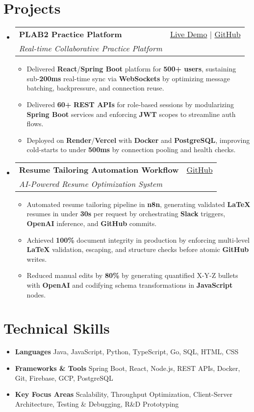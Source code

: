 \documentclass[letterpaper,11pt]{article}
\makeatletter
\newcommand{\resumeItem}[1]{\item\small{#1 \vspace{-2pt}}}
\newcommand{\resumeSubheading}[4]{
  \vspace{-1pt}\item
    \begin{tabular*}{0.97\textwidth}[t]{l@{\extracolsep{\fill}}r}
      \textbf{#1} & #2 \\
      \textit{\small#3} & \textit{\small #4} \\
    \end{tabular*}\vspace{-5pt}
}
\newcommand{\resumeSubHeadingListStart}{\begin{itemize}[leftmargin=*]}
\newcommand{\resumeSubHeadingListEnd}{\end{itemize}}
\newcommand{\resumeItemListStart}{\begin{itemize}}
\newcommand{\resumeItemListEnd}{\end{itemize}\vspace{-5pt}}
\makeatother
\begin{document}
\section{Projects}
  \resumeSubHeadingListStart
    \resumeSubheading
      {\textbf{PLAB2 Practice Platform}}{\href{https://plab2practice.com}{Live Demo} | \href{https://github.com/altansaid/plab2projectnew}{GitHub}}
      {Real-time Collaborative Practice Platform}{}
      \resumeItemListStart
        \resumeItem{Delivered \textbf{React}/\textbf{Spring Boot} platform for \textbf{500+ users}, sustaining sub-\textbf{200ms} real-time sync via \textbf{WebSockets} by optimizing message batching, backpressure, and connection reuse.}
        \resumeItem{Delivered \textbf{60+} \textbf{REST APIs} for role-based sessions by modularizing \textbf{Spring Boot} services and enforcing \textbf{JWT} scopes to streamline auth flows.}
        \resumeItem{Deployed on \textbf{Render}/\textbf{Vercel} with \textbf{Docker} and \textbf{PostgreSQL}, improving cold-starts to under \textbf{500ms} by connection pooling and health checks.}
      \resumeItemListEnd

    \resumeSubheading
      {\textbf{Resume Tailoring Automation Workflow}}{\href{https://github.com/altansaid/resume-automation-workflow}{GitHub}}
      {AI-Powered Resume Optimization System}{}
      \resumeItemListStart
    \resumeItem{Automated resume tailoring pipeline in \textbf{n8n}, generating validated \textbf{LaTeX} resumes in under \textbf{30s} per request by orchestrating \textbf{Slack} triggers, \textbf{OpenAI} inference, and \textbf{GitHub} commits.}
    \resumeItem{Achieved \textbf{100\%} document integrity in production by enforcing multi-level \textbf{LaTeX} validation, escaping, and structure checks before atomic \textbf{GitHub} writes.}
    \resumeItem{Reduced manual edits by \textbf{80\%} by generating quantified X-Y-Z bullets with \textbf{OpenAI} and codifying schema transformations in \textbf{JavaScript} nodes.}



      \resumeItemListEnd
  \resumeSubHeadingListEnd

\section{Technical Skills}
  \resumeItemListStart
    \resumeItem{\textbf{Languages}}{Java, JavaScript, Python, TypeScript, Go, SQL, HTML, CSS}
    \resumeItem{\textbf{Frameworks \& Tools}}{Spring Boot, React, Node.js, REST APIs, Docker, Git, Firebase, GCP, PostgreSQL}
    \resumeItem{\textbf{Key Focus Areas}}{Scalability, Throughput Optimization, Client-Server Architecture, Testing \& Debugging, R\&D Prototyping}
  \resumeItemListEnd
\end{document}
